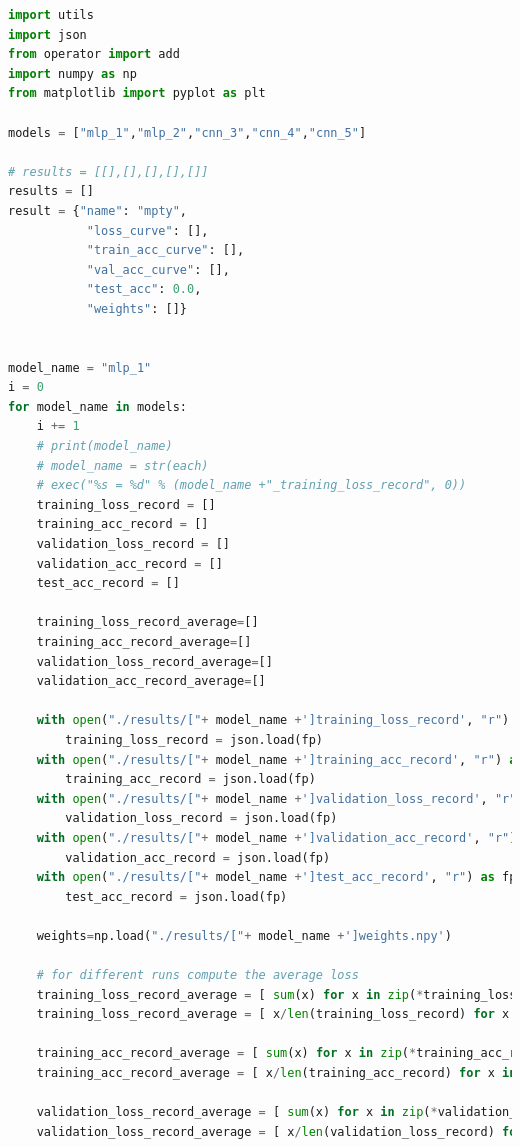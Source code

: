 \documentclass[3p,times,procedia]{elsarticle}
\begin{document}
\begin{lstlisting}[language=Python]
import utils
import json
from operator import add
import numpy as np
from matplotlib import pyplot as plt

models = ["mlp_1","mlp_2","cnn_3","cnn_4","cnn_5"]

# results = [[],[],[],[],[]]
results = []
result = {"name": "mpty",
           "loss_curve": [],
           "train_acc_curve": [],
           "val_acc_curve": [],
           "test_acc": 0.0,
           "weights": []}


model_name = "mlp_1"
i = 0
for model_name in models:
    i += 1
    # print(model_name)
    # model_name = str(each)
    # exec("%s = %d" % (model_name +"_training_loss_record", 0))
    training_loss_record = []
    training_acc_record = []
    validation_loss_record = []
    validation_acc_record = []
    test_acc_record = []

    training_loss_record_average=[]
    training_acc_record_average=[]
    validation_loss_record_average=[]
    validation_acc_record_average=[]

    with open("./results/["+ model_name +']training_loss_record', "r") as fp:
        training_loss_record = json.load(fp)
    with open("./results/["+ model_name +']training_acc_record', "r") as fp:
        training_acc_record = json.load(fp)
    with open("./results/["+ model_name +']validation_loss_record', "r") as fp:
        validation_loss_record = json.load(fp)
    with open("./results/["+ model_name +']validation_acc_record', "r") as fp:
        validation_acc_record = json.load(fp)
    with open("./results/["+ model_name +']test_acc_record', "r") as fp:
        test_acc_record = json.load(fp)

    weights=np.load("./results/["+ model_name +']weights.npy')

    # for different runs compute the average loss
    training_loss_record_average = [ sum(x) for x in zip(*training_loss_record) ]
    training_loss_record_average = [ x/len(training_loss_record) for x in training_loss_record_average ]

    training_acc_record_average = [ sum(x) for x in zip(*training_acc_record) ]
    training_acc_record_average = [ x/len(training_acc_record) for x in training_acc_record_average ]

    validation_loss_record_average = [ sum(x) for x in zip(*validation_loss_record) ]
    validation_loss_record_average = [ x/len(validation_loss_record) for x in validation_loss_record_average ]


\end{lstlisting}
\end{document}
